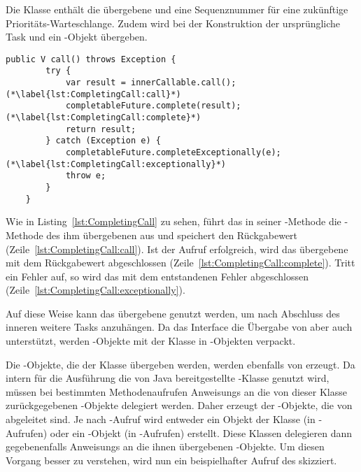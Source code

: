 Die Klasse  enthält die übergebene  und eine Sequenznummer für eine zukünftige Prioritäts-Warteschlange. Zudem wird bei der Konstruktion der ursprüngliche Task und ein -Objekt übergeben. 
\begin{lstlisting}[caption={\code{call()}-Methode von \class{CompletingCallable}. Das enthaltene \class{Callable} wird ausgeführt und dann das \class{CompletableFuture} abgeschlossen.}, label={lst:CompletingCall},float={thbp}]
	public V call() throws Exception {
		try {
			var result = innerCallable.call(); (*\label{lst:CompletingCall:call}*)
			completableFuture.complete(result); (*\label{lst:CompletingCall:complete}*)
			return result;
		} catch (Exception e) {
			completableFuture.completeExceptionally(e); (*\label{lst:CompletingCall:exceptionally}*)
			throw e;
		}
	}
\end{lstlisting}
Wie in Listing~\ref{lst:CompletingCall} zu sehen, führt das  in seiner -Methode die -Methode des ihm übergebenen   aus und speichert den Rückgabewert (Zeile~\ref{lst:CompletingCall:call}). Ist der Aufruf erfolgreich, wird das übergebene  mit dem Rückgabewert abgeschlossen (Zeile~\ref{lst:CompletingCall:complete}). Tritt ein Fehler auf, so wird das   mit dem entstandenen Fehler abgeschlossen (Zeile~\ref{lst:CompletingCall:exceptionally}).

Auf diese Weise kann das übergebene  genutzt werden, um nach Abschluss des inneren  weitere Tasks anzuhängen.
Da das Interface  die Übergabe von  aber auch  unterstützt, werden -Objekte mit der Klasse  in -Objekten verpackt.

Die -Objekte, die der Klasse  übergeben werden, werden ebenfalls von  erzeugt. Da intern für die Ausführung die von Java bereitgestellte -Klasse genutzt wird, müssen bei bestimmten Methodenaufrufen \glspl{Anweisung} an die von dieser Klasse zurückgegebenen -Objekte delegiert werden. Daher erzeugt der 
-Objekte, die von  abgeleitet sind. Je nach -Aufruf wird entweder ein Objekt der Klasse  (in -Aufrufen) oder ein -Objekt (in -Aufrufen) erstellt. Diese Klassen delegieren dann gegebenenfalls \glspl{Anweisung} an die ihnen übergebenen -Objekte. Um diesen Vorgang besser zu verstehen, wird nun ein beispielhafter Aufruf des  skizziert.

